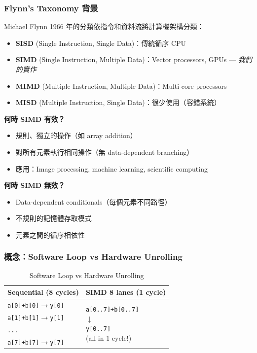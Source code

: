 \documentclass[journal]{IEEEtran}
\begin{document}
\subsubsection{Flynn's Taxonomy 背景}
Michael Flynn 1966 年的分類依指令和資料流將計算機架構分類：
\begin{itemize}
    \item \textbf{SISD} (Single Instruction, Single Data)：傳統循序 CPU
    \item \textbf{SIMD} (Single Instruction, Multiple Data)：Vector processors, GPUs --- \textit{我們的實作}
    \item \textbf{MIMD} (Multiple Instruction, Multiple Data)：Multi-core processors
    \item \textbf{MISD} (Multiple Instruction, Single Data)：很少使用（容錯系統）
\end{itemize}

\textbf{何時 SIMD 有效？}
\begin{itemize}
    \item 規則、獨立的操作（如 array addition）
    \item 對所有元素執行相同操作（無 data-dependent branching）
    \item 應用：Image processing, machine learning, scientific computing
\end{itemize}

\textbf{何時 SIMD 無效？}
\begin{itemize}
    \item Data-dependent conditionals（每個元素不同路徑）
    \item 不規則的記憶體存取模式
    \item 元素之間的循序相依性
\end{itemize}

\subsubsection{概念：Software Loop vs Hardware Unrolling}
\begin{table}[!t]
\centering
\caption{Software Loop vs Hardware Unrolling}
\footnotesize
\begin{tabular}{@{}p{}|p{}@{}}
\toprule
\textbf{Sequential (8 cycles)} & \textbf{SIMD 8 lanes (1 cycle)} \\
\midrule
\texttt{a[0]+b[0]$\to$y[0]} & \multirow{5}{*}{\parbox{0.4\columnwidth}{\centering\texttt{a[0..7]+b[0..7]}\\$\downarrow$\\\texttt{y[0..7]}\\(all in 1 cycle!)}} \\
\texttt{a[1]+b[1]$\to$y[1]} & \\
\texttt{...} & \\
\texttt{a[7]+b[7]$\to$y[7]} & \\
\bottomrule
\end{tabular}
\end{table}
\end{document}

